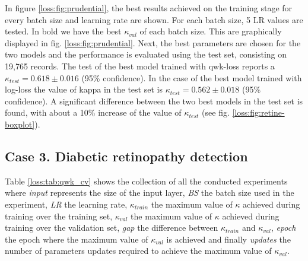 In figure \ref{loss:fig:prudential}, the best results achieved on the training stage for every batch size and learning rate are shown. For each batch size, 5 LR values are tested. In bold we have the best $\kappa_{val}$ of each batch size. This are graphically displayed in fig. \ref{loss:fig:prudential}.
Next, the best parameters are chosen for the two models and the performance is evaluated using the test set, consisting on 19,765 records. The test of the best model trained with qwk-loss reports a $\kappa_{test} = 0.618 \pm 0.016$ (95\% confidence). In the case of the best model trained with log-loss the value of kappa in the test set is $\kappa_{test} = 0.562 \pm 0.018$ (95\% confidence). A significant difference between the two best models in the test set is found, with about a 10\% increase of the value of $\kappa_{test}$ (see fig. \ref{loss:fig:retine-boxplot}).


\subsection{Case 3. Diabetic retinopathy detection}

Table \ref{loss:tab:qwk_cv} shows the collection of all the conducted experiments where \emph{input} represents the size of the input layer, \emph{BS} the batch size used in the experiment, \emph{LR} the learning rate, \emph{$\kappa_{train}$} the maximum value of $\kappa$ achieved during training over the training set, \emph{$\kappa_{val}$} the maximum value of $\kappa$ achieved during training over the validation set, \emph{gap} the difference between $\kappa_{train}$ and $\kappa_{val}$, \emph{epoch} the epoch where the maximum value of $\kappa_{val}$ is achieved and finally \emph{updates} the number of parameters updates required to achieve the maximum value of $\kappa_{val}$.


